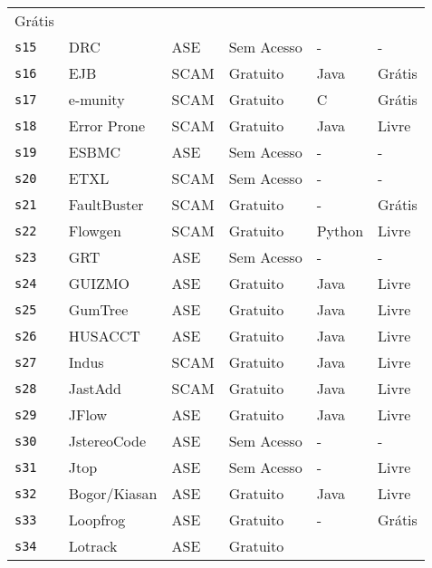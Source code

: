 \begin{longtable}{l l l l p{3cm} l}
      Grátis \\
    \texttt{s15} &
      DRC &
      ASE &
      Sem Acesso &
      - &
      - \\
    \texttt{s16} &
      EJB &
      SCAM &
      Gratuito &
      Java &
      Grátis \\
    \texttt{s17} &
      e-munity &
      SCAM &
      Gratuito &
      C &
      Grátis \\
    \texttt{s18} &
      Error Prone &
      SCAM &
      Gratuito &
      Java &
      Livre \\
    \texttt{s19} &
      ESBMC &
      ASE &
      Sem Acesso &
      - &
      - \\
    \texttt{s20} &
      ETXL &
      SCAM &
      Sem Acesso &
      - &
      - \\
    \texttt{s21} &
      FaultBuster &
      SCAM &
      Gratuito &
      - &
      Grátis \\
    \texttt{s22} &
      Flowgen &
      SCAM &
      Gratuito &
      Python &
      Livre \\
    \texttt{s23} &
      GRT &
      ASE &
      Sem Acesso &
      - &
      - \\
    \texttt{s24} &
      GUIZMO &
      ASE &
      Gratuito &
      Java &
      Livre \\
    \texttt{s25} &
      GumTree &
      ASE &
      Gratuito &
      Java &
      Livre \\
    \texttt{s26} &
      HUSACCT &
      ASE &
      Gratuito &
      Java &
      Livre \\
    \texttt{s27} &
      Indus &
      SCAM &
      Gratuito &
      Java &
      Livre \\
    \texttt{s28} &
      JastAdd &
      SCAM &
      Gratuito &
      Java &
      Livre \\
    \texttt{s29} &
      JFlow &
      ASE &
      Gratuito &
      Java &
      Livre \\
    \texttt{s30} &
      JstereoCode &
      ASE &
      Sem Acesso &
      - &
      - \\
    \texttt{s31} &
      Jtop &
      ASE &
      Sem Acesso &
      - &
      Livre \\
    \texttt{s32} &
      Bogor/Kiasan &
      ASE &
      Gratuito &
      Java &
      Livre \\
    \texttt{s33} &
      Loopfrog &
      ASE &
      Gratuito &
      - &
      Grátis \\
    \texttt{s34} &
      Lotrack &
      ASE &
      Gratuito &

\end{longtable}
